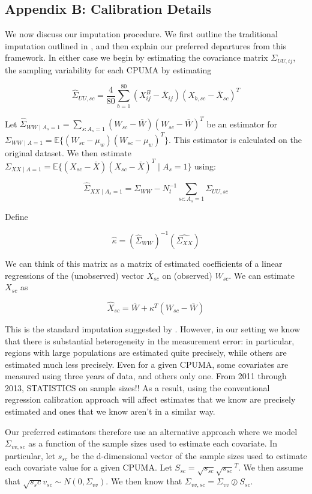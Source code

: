 \documentclass[12pt]{article}
\begin{document}
\subsection{Appendix B: Calibration Details}

We now discuss our imputation procedure. We first outline the traditional imputation outlined in \cite{carroll2006measurement}, and then explain our preferred departures from this framework. In either case we begin by estimating the covariance matrix $\Sigma_{UU, ij}$, the sampling variability for each CPUMA by estimating

$$
\hat{\Sigma}_{UU, sc} = \frac{4}{80}\sum_{b=1}^{80}(X_{ij}^B - \bar{X}_{ij})(X_{b, sc} - \bar{X}_{sc})^T
$$

Let $\hat{\Sigma}_{WW \mid A_s = 1} = \sum_{s: A_s = 1} (W_{sc} - \bar{W})(W_{sc} - \bar{W})^T$ be an estimator for $\Sigma_{WW \mid A = 1} = \mathbb{E}\{(W_{sc} - \mu_w)(W_{sc} - \mu_w)^T\}$. This estimator is calculated on the original dataset. We then estimate $\Sigma_{XX \mid A = 1} = \mathbb{E}\{(X_{sc} - \bar{X})(X_{sc} - \bar{X})^T \mid A_s = 1\}$ using:

$$
\hat{\Sigma}_{XX \mid A_s = 1} = \Sigma_{WW} - N_t^{-1}\sum_{sc: A_s = 1} \Sigma_{UU, sc}
$$

Define

$$
\hat{\kappa} = (\hat{\Sigma}_{WW})^{-1}(\hat{\Sigma_{XX}})
$$

We can think of this matrix as a matrix of estimated coefficients of a linear regressions of the (unobserved) vector $X_{sc}$ on (observed) $W_{sc}$. We can estimate $X_{sc}$ as

$$
\hat{X}_{sc} = \bar{W} + \kappa^T(W_{sc} - \bar{W})
$$

This is the standard imputation suggested by \cite{carroll2006measurement}. However, in our setting we know that there is substantial heterogeneity in the measurement error: in particular, regions with large populations are estimated quite precisely, while others are estimated much less precisely. Even for a given CPUMA, some covariates are measured using three years of data, and others only one. From 2011 through 2013, STATISTICS on sample sizes!! As a result, using the conventional regression calibration approach will affect estimates that we know are precisely estimated and ones that we know aren't in a similar way. 

Our preferred estimators therefore use an alternative approach where we model $\Sigma_{vv, sc}$ as a function of the sample sizes used to estimate each covariate. In particular, let $s_{sc}$ be the d-dimensional vector of the sample sizes used to estimate each covariate value for a given CPUMA. Let $S_{sc} = \sqrt{s_{sc}}\sqrt{s_{sc}}^T$. We then assume that $\sqrt{s_sc}v_{sc} \sim N(0, \Sigma_{vv})$. We then know that $\Sigma_{vv, sc} = \Sigma_{vv} \oslash S_{sc}$. 
\end{document}
